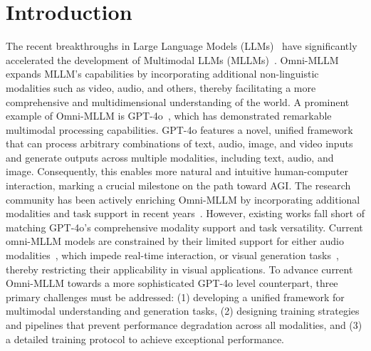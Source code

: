 
\section{Introduction}\label{sec:intro}

The recent breakthroughs in Large Language Models (LLMs)~\cite{openai2023gpt4, llama3_2024, reid2024gemini1_5} have significantly accelerated the development of Multimodal LLMs (MLLMs)~\cite{openai2024gpt4ocard, llama32, internvl_2024, llava-next_2024, qwen2-vl_2024}.
Omni-MLLM expands MLLM's capabilities by incorporating additional non-linguistic modalities such as video, audio, and others, thereby facilitating a more comprehensive and multidimensional understanding of the world. A prominent example of Omni-MLLM is GPT-4o~\cite{openai2024gpt4ocard}, which has demonstrated remarkable multimodal processing capabilities.  GPT-4o features a novel, unified framework that can process arbitrary combinations of text, audio, image, and video inputs and generate outputs across multiple modalities, including text, audio, and image. Consequently, this enables more natural and intuitive human-computer interaction, marking a crucial milestone on the path toward AGI. The research community has been actively enriching Omni-MLLM by incorporating additional modalities and task support in recent years~\cite{baichuan-omni,emu3,deepseek_janus,muse_vl, mini_omni,mini_omni2, vita,fu2025vita,yao2024minicpm}. However, existing works fall short of matching GPT-4o's comprehensive modality support and task versatility.  Current omni-MLLM models are constrained by their limited support for either audio modalities~\cite{baichuan-omni, emu3, deepseek_janus,muse_vl}, which impede real-time interaction, or visual generation tasks~\cite{mini_omni, vita}, thereby restricting their applicability in visual applications.  To advance current Omni-MLLM towards a more sophisticated GPT-4o level counterpart, three primary challenges must be addressed: (1) developing a unified framework for multimodal understanding and generation tasks, (2) designing training strategies and pipelines that prevent performance degradation across all modalities, and (3) a detailed training protocol to achieve exceptional performance.

